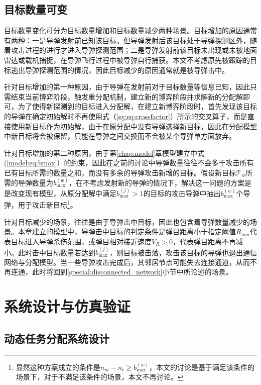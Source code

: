 \subsection{目标数量可变}
\label{special:target_num_change}

目标数量变化可分为目标数量增加和目标数量减少两种场景。目标增加的原因通常有两种：一是导弹发射前已知该目标，但导弹发射后该目标处于导弹探测区外，随着攻击过程的进行才进入导弹探测范围；二是导弹发射前该目标未出现或未被地面雷达或载机捕捉，在导弹飞行过程中被导弹自行捕获。本文不考虑原先被跟踪的目标逃出导弹探测范围的情况，因此目标减少的原因通常就是被导弹击中。

针对目标增加的第一种原因，由于导弹在发射前对于目标数量等信息已知，因此只需结束当前博弈阶段，触发重分配机制，建立新的博弈阶段并求解新的分配解即可，为了使得新探测到的目标进入分配解，在建立新博弈阶段时，首先发现该目标的导弹在确定初始解时不再使用式（\ref{sg:eq:crossfactor}）所示的交叉算子，而是直接使用新目标作为初始解，由于在原分配中没有导弹选择新目标，因此在分配模型中新目标将会被保留，只能在导弹之间交换而不会被某个导弹单方面放弃。

针对目标增加的第二种原因，由于第\ref{chap:model}章模型建立中式(\ref{model:eq:bmax}）的约束，因此在之前的讨论中导弹数量往往不会多于攻击所有已有目标所需的数量之和，而没有多余的导弹攻击新增的目标。假设新目标$\mathcal{T}_w$所需的导弹数量为$b_{\text{max}}^{(w)}$，在不考虑发射新的导弹的情况下，解决这一问题的方案是是改变现有模型，从原分配解中满足$b_{\text{max}}^{(j)}>1$的目标的攻击导弹中抽出$b_{\text{max}}^{(w)}$个导弹，用于攻击新目标\footnote{显然这种方案成立的条件是$n_m-n_t \geq b_{\text{max}}^{(w)}$，本文的讨论是基于满足该条件的场景下，对于不满足该条件的场景，本文不再讨论。}。

针对目标减少的场景，往往是由于导弹击中目标，因此也包含着导弹数量减少的场景。本章建立的模型中，导弹击中目标的判定条件是弹目距离小于指定阈值$R_{\text{min}}$代表目标进入导弹杀伤范围，或弹目相对接近速度$V_R>0$，代表弹目距离不再减小。此时击中目标数量若达到$b_{\text{max}}^{(j)}$，则目标被击落，攻击该目标的导弹也退出通信网络与分配模型。当一些导弹攻击完成后，其邻居节点可能失去连接通道，从而不再连通，此时将回到\ref{special:disconnected_network}小节中所论述的场景。

\section{系统设计与仿真验证}
\label{sg:system&simulation}

\subsection{动态任务分配系统设计}
\label{sg:dynamic_system}

